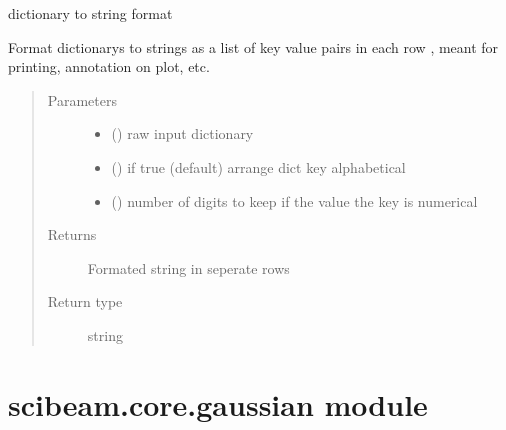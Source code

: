 \documentclass[letterpaper,10pt,english]{sphinxmanual}
\begin{document}
\begin{fulllineitems}
\label{\detokenize{scibeam.core:scibeam.core.formatter.format_dict}}
dictionary to string format

Format dictionarys to strings as a list of key value pairs in each row ,
meant for printing, annotation on plot, etc.
\begin{quote}\begin{description}
\item[{Parameters}] \leavevmode\begin{itemize}
\item {} 
 () \textendash{} raw input dictionary

\item {} 
 () \textendash{} if true (default) arrange dict key alphabetical

\item {} 
 () \textendash{} number of digits to keep if the value the key is numerical

\end{itemize}

\item[{Returns}] \leavevmode
Formated string in seperate rows

\item[{Return type}] \leavevmode
string

\end{description}\end{quote}

\end{fulllineitems}



\section{scibeam.core.gaussian module}
\label{\detokenize{scibeam.core:module-scibeam.core.gaussian}}\label{\detokenize{scibeam.core:scibeam-core-gaussian-module}}
\end{document}
